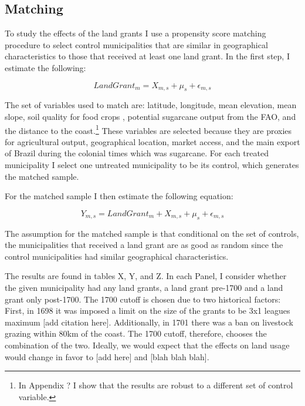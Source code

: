 \documentclass{article}
\begin{document}
\subsection{Matching}

To study the effects of the land grants I use a propensity score matching procedure to select control municipalities that are similar in geographical characteristics to those that received at least one land grant. In the first step, I estimate the following:

\begin{equation}
  LandGrant_m = X_{m,s} + \mu_s + \epsilon_{m,s}
\end{equation}

The set of variables used to match are: latitude, longitude, mean elevation, mean slope, soil quality for food crops \parencite{Galor2016-ba}, potential sugarcane output from the FAO, and the distance to the coast.\footnote{In Appendix ? I show that the results are robust to a different set of control variable.} These variables are selected because they are proxies for agricultural output, geographical location, market access, and the main export of Brazil during the colonial times which was sugarcane. For each treated municipality I select one untreated municipality to be its control, which generates the matched sample.

For the matched sample I then estimate the following equation:

\begin{equation}
  Y_{m,s} = LandGrant_m + X_{m,s} + \mu_s + \epsilon_{m,s}
\end{equation}

The assumption for the matched sample is that conditional on the set of controls, the municipalities that received a land grant are as good as random since the control municipalities had similar geographical characteristics. 

The results are found in tables X, Y, and Z. In each Panel, I consider whether the given municipality had any land grants, a land grant pre-1700 and a land grant only post-1700. The 1700 cutoff is chosen due to two historical factors: First, in 1698 it was imposed a limit on the size of the grants to be 3x1 leagues maximum [add citation here]. Additionally, in 1701 there was a ban on livestock grazing within 80km of the coast. The 1700 cutoff, therefore, chooses the combination of the two. Ideally, we would expect that the effects on land usage would change in favor to [add here] and [blah blah blah].
\end{document}
